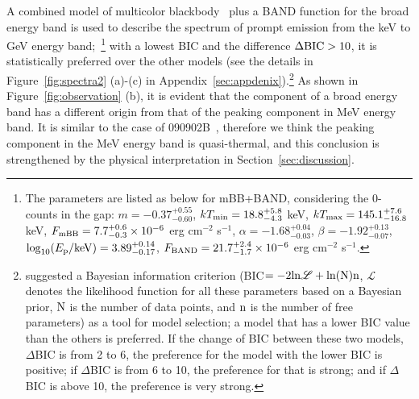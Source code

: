 \documentclass[linenumbers,twocolumn]{aastex631}
\begin{document}
 
  A combined model of multicolor blackbody~\citep[mBB, e.g. see details in][]{2008ApJ...682..463P,2010ApJ...709L.172R,2018ApJ...866...13H} plus a BAND function for the broad energy band is used to describe the spectrum of prompt emission from the keV to GeV energy band;~\footnote{The parameters are listed as below for mBB+BAND, considering the 0-counts in the gap: $m=-0.37^{+0.55}_{-0.60}$, $kT_{\rm min}=18.8^{+5.8}_{-4.3}$ keV, $kT_{\rm max}=145.1^{+7.6}_{-16.8}$ keV, $F_{\rm mBB}=7.7^{+0.6}_{-0.3}\times10^{-6}$ erg cm$^{-2}$ s$^{-1}$, $\alpha=-1.68^{+0.04}_{-0.03}$, $\beta=-1.92^{+0.13}_{-0.07}$, $\log_{10}(E_{\rm p}/{\rm keV})=3.89^{+0.14}_{-0.17}$, $F_{\rm BAND}=21.7^{+2.4}_{-1.7}\times10^{-6}$ erg cm$^{-2}$ s$^{-1}$.} with a lowest BIC and the difference $\Delta \rm{BIC}>10$, it is statistically preferred over the other models (see the details in Figure~\ref{fig:spectra2} (a)-(c) in Appendix~\ref{sec:appdenix}).\footnote{\cite{2016MNRAS.463.1144W} suggested a Bayesian information criterion  (BIC$=-2\rm{ln} \mathscr{L} +\rm{ln} (N)n$, $\mathscr{L}$ denotes the likelihood
function for all these parameters based on a Bayesian prior, $\rm N$ is the number of data points, and $\rm n$ is the number of free parameters) as a tool for model selection; a model that has a lower BIC value than the others is preferred. If the change of BIC between these two models, $\Delta$BIC is from 2 to 6, the preference for the model with the lower BIC is positive; if $\Delta$BIC is from 6 to 10, the preference for that is strong; and if $\Delta$BIC is above 10, the preference is very strong.} 
  As shown in Figure~\ref{fig:observation} (b), it is evident that the component of a broad energy band has a different origin from that of the peaking component in MeV energy band. It is similar to the case of 090902B~\citep{2009ApJ...706L.138A, 2010ApJ...709L.172R, 2012MNRAS.420..468P}, therefore we think the peaking component in the MeV energy band is quasi-thermal, and this conclusion is strengthened by the physical interpretation in Section~\ref{sec:discussion}.
\end{document}
